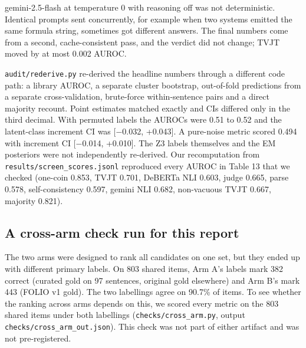 \documentclass[11pt,letterpaper]{article}
\begin{document}
gemini-2.5-flash at temperature 0 with reasoning off was not deterministic. Identical prompts sent concurrently, for example when two systems emitted the same formula string, sometimes got different answers. The final numbers come from a second, cache-consistent pass, and the verdict did not change; TVJT moved by at most 0.002 AUROC.

\texttt{audit/\allowbreak{}rederive.py} re-derived the headline numbers through a different code path: a library AUROC, a separate cluster bootstrap, out-of-fold predictions from a separate cross-validation, brute-force within-sentence pairs and a direct majority recount. Point estimates matched exactly and CIs differed only in the third decimal. With permuted labels the AUROCs were 0.51 to 0.52 and the latent-class increment CI was [$-$0.032, +0.043]. A pure-noise metric scored 0.494 with increment CI [$-$0.014, +0.010]. The Z3 labels themselves and the EM posteriors were not independently re-derived. Our recomputation from \texttt{results/\allowbreak{}screen\_\allowbreak{}\allowbreak{}scores.jsonl} reproduced every AUROC in Table 13 that we checked (one-coin 0.853, TVJT 0.701, DeBERTa NLI 0.603, judge 0.665, parse 0.578, self-consistency 0.597, gemini NLI 0.682, non-vacuous TVJT 0.667, majority 0.821).

\subsection{A cross-arm check run for this report}

The two arms were designed to rank all candidates on one set, but they ended up with different primary labels. On 803 shared items, Arm A's labels mark 382 correct (curated gold on 97 sentences, original gold elsewhere) and Arm B's mark 443 (FOLIO v1 gold). The two labellings agree on 90.7\% of items. To see whether the ranking across arms depends on this, we scored every metric on the 803 shared items under both labellings (\texttt{checks/\allowbreak{}cross\_\allowbreak{}\allowbreak{}arm.py}, output \texttt{checks/\allowbreak{}cross\_\allowbreak{}\allowbreak{}arm\_\allowbreak{}\allowbreak{}out.json}). This check was not part of either artifact and was not pre-registered.
\end{document}
